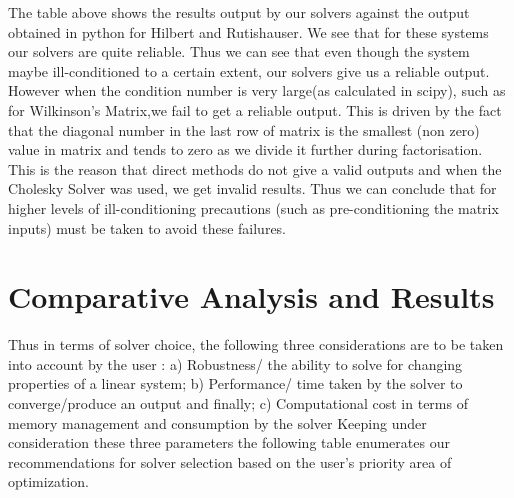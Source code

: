 \documentclass[twoside,twocolumn]{article}
\begin{document}
The table above shows the results output by our solvers against the output obtained in python for Hilbert and Rutishauser. We see that for these systems our solvers are quite reliable. Thus we can see that even though the system maybe ill-conditioned to a certain extent, our solvers give us a reliable output. \\
However when the condition number is very large(as calculated in scipy), such as for Wilkinson's Matrix,we fail to get a reliable output. This is driven by the fact that the diagonal number in the last row of matrix is the smallest (non zero) value in matrix and tends to zero as we divide it further during factorisation. This is the reason that direct methods do not give a valid outputs and when the Cholesky Solver was used, we get invalid results. Thus we can conclude that for higher levels of ill-conditioning precautions (such as pre-conditioning the matrix inputs) must be taken to avoid these failures.

\begin{table}[H]
\caption{Wilkinson’s Matrix where our Solvers Fail}
\label{tab:my-table}
\vspace{-5mm}
\end{table}
\section{ Comparative Analysis and Results}
Thus in terms of solver choice, the following three considerations are to be taken into account by the user :
a) Robustness/ the ability to solve for changing properties of a linear system;
b) Performance/ time taken by the solver to converge/produce an output and finally;
c) Computational cost in terms of memory management and consumption by the solver
Keeping under consideration these three parameters the following table enumerates our recommendations for solver selection based on the user's priority area of optimization.
\end{document}
